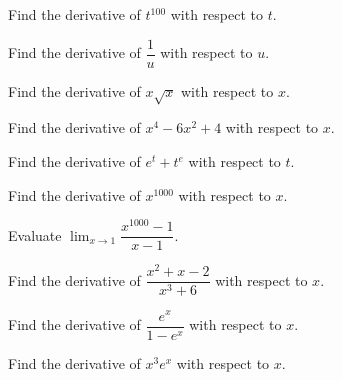 \documentclass[11pt]{article}
\theoremstyle{break}
\numberwithin{equation}{theorem}
\begin{document}
\begin{example}
    Find the derivative of $t^{100}$ with respect to $t$.
\end{example}
\vspace{8em}

\begin{example}
    Find the derivative of $\dfrac{1}{u}$ with respect to $u$.
\end{example}
\vspace{8em}

\begin{example}
    Find the derivative of $x\sqrt{x}$ with respect to $x$.
\end{example}
\vspace{8em}

\begin{example}
    Find the derivative of $x^4-6x^2+4$ with respect to $x$.
\end{example}
\vspace{8em}

\begin{example}
    Find the derivative of $e^t+t^e$ with respect to $t$.
\end{example}
\vspace{8em}

\begin{example}
    Find the derivative of $x^{1000}$ with respect to $x$.
\end{example}
\vspace{8em}

\begin{example}
    Evaluate $\displaystyle\lim_{x\to 1}\dfrac{x^{1000}-1}{x-1}$.
\end{example}
\vspace{8em}

\begin{example}
    Find the derivative of $\dfrac{x^2+x-2}{x^3+6}$ with respect to $x$.
\end{example}
\vspace{8em}

\begin{example}
    Find the derivative of $\dfrac{e^x}{1-e^x}$ with respect to $x$.
\end{example}
\vspace{8em}

\begin{example}
    Find the derivative of $x^3e^x$ with respect to $x$.
\end{example}
\vspace{8em}
\end{document}
